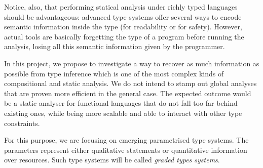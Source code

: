 \documentclass{article}[11pt]
\begin{document}
Notice, also, that performing statical analysis under richly typed languages should be advantageous:  advanced type systems offer several ways to encode semantic information inside the type (for readability or for safety). However, actual tools are basically forgetting the type of a program before running the analysis, losing all this semantic information given by the programmer.

In this project, we propose to investigate a way to recover as much information as possible from type inference which is one of the most complex kinds of compositional and static analysis.  We do not intend to stamp out global analyses that are proven more efficient in the general case. The expected outcome would be a static analyser for functional languages that do not fall too far behind existing ones, while being more scalable and able to interact with other type constraints.


For this purpose, we are focusing on emerging parametrised type systems. The parameters represent either qualitative statements or quantitative information over resources. Such type systems will be called {\em graded types systems}.
\end{document}
